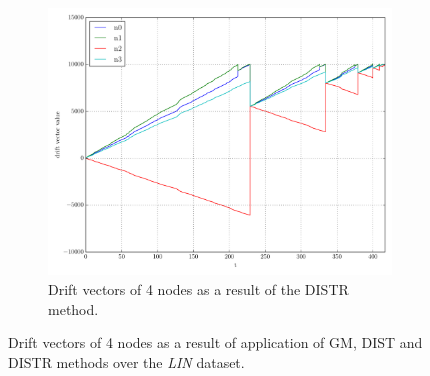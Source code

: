\begin{figure}[!b]
\begin{subfigure}{0.32\textwidth}
  \includegraphics[width=\linewidth]{img/matchings_classic_distroptpair_drifts.pdf}
  \caption{Drift vectors of 4 nodes as a result of the DISTR method.}
\end{subfigure}
\vspace{0.5cm}
\caption{Drift vectors of 4 nodes as a result of application of GM, DIST and DISTR methods over the \emph{LIN} dataset.} \label{fig:matchingComp-drifts}
\end{figure}
